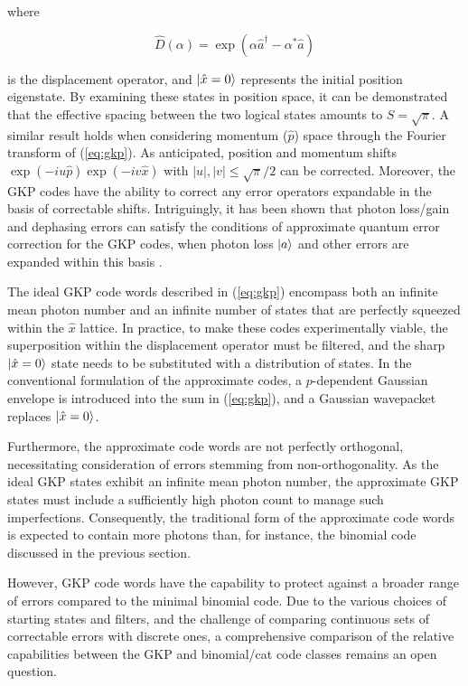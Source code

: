 \documentclass[11pt]{article}
\newcommand\0{\mathbf{0}}
\newcommand\<{\langle}
\renewcommand\>{\rangle}
\begin{document}
where 

$$\hat{D}(\alpha) = \exp(\alpha \hat{a}^\dag - \alpha^* \hat{a})$$

is the displacement operator, and $\ket{\hat{x} = 0}$ represents the initial position eigenstate. By examining these states in position space, it can be demonstrated that the effective spacing between the two logical states amounts to $S=\sqrt{\pi}$. A similar result holds when considering momentum ($\hat{p}$) space through the Fourier transform of (\ref{eq:gkp}). As anticipated, position and momentum shifts $\exp(-iu\hat{p})\exp(-iv\hat{x})$ with $|u|, |v| \leq \sqrt{\pi}/2$ can be corrected. Moreover, the GKP codes have the ability to correct any error operators expandable in the basis of correctable shifts. Intriguingly, it has been shown that photon loss/gain and dephasing errors can satisfy the conditions of approximate quantum error correction for the GKP codes, when photon loss $\ket{a}$ and other errors are expanded within this basis \cite{michael2016new}.

The ideal GKP code words described in (\ref{eq:gkp}) encompass both an infinite mean photon number and an infinite number of states that are perfectly squeezed within the $\hat{x}$ lattice. In practice, to make these codes experimentally viable, the superposition within the displacement operator must be filtered, and the sharp $\ket{\hat{x}=0}$ state needs to be substituted with a distribution of states. In the conventional formulation of the approximate codes, a $p$-dependent Gaussian envelope is introduced into the sum in (\ref{eq:gkp}), and a Gaussian wavepacket replaces $\ket{\hat{x}=0}$.

Furthermore, the approximate code words are not perfectly orthogonal, necessitating consideration of errors stemming from non-orthogonality. As the ideal GKP states exhibit an infinite mean photon number, the approximate GKP states must include a sufficiently high photon count to manage such imperfections. Consequently, the traditional form of the approximate code words is expected to contain more photons than, for instance, the binomial code discussed in the previous section.

However, GKP code words have the capability to protect against a broader range of errors compared to the minimal binomial code. Due to the various choices of starting states and filters, and the challenge of comparing continuous sets of correctable errors with discrete ones, a comprehensive comparison of the relative capabilities between the GKP and binomial/cat code classes remains an open question.
\end{document}

